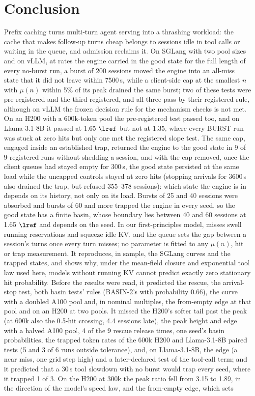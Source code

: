 \section{Conclusion}\label{sec:conclusion}

Prefix caching turns multi-turn agent serving into a thrashing workload: the cache that makes follow-up turns cheap belongs to sessions idle in tool calls or waiting in the queue, and admission reclaims it. On SGLang with two pool sizes and on vLLM, at rates the engine carried in the good state for the full length of every no-burst run, a burst of 200 sessions moved the engine into an all-miss state that it did not leave within 7500\,s, while a client-side cap at the smallest $n$ with $\mu(n)$ within 5\% of its peak drained the same burst; two of these tests were pre-registered and the third registered, and all three pass by their registered rule, although on vLLM the frozen decision rule for the mechanism checks is not met. On an H200 with a 600k-token pool the pre-registered test passed too, and on Llama-3.1-8B it passed at 1.65 $\lref$ but not at 1.35, where every BURST run was stuck at zero hits but only one met the registered slope test. The same cap, engaged inside an established trap, returned the engine to the good state in 9 of 9 registered runs without shedding a session, and with the cap removed, once the client queues had stayed empty for 300\,s, the good state persisted at the same load while the uncapped controls stayed at zero hits (stopping arrivals for 3600\,s also drained the trap, but refused 355--378 sessions): which state the engine is in depends on its history, not only on its load. Bursts of 25 and 40 sessions were absorbed and bursts of 60 and more trapped the engine in every seed, so the good state has a finite basin, whose boundary lies between 40 and 60 sessions at 1.65 $\lref$ and depends on the seed. In our first-principles model, misses swell running reservations and squeeze idle KV, and the queue sets the gap between a session's turns once every turn misses; no parameter is fitted to any $\mu(n)$, hit or trap measurement. It reproduces, in sample, the SGLang curves and the trapped states, and shows why, under the mean-field closure and exponential tool law used here, models without running KV cannot predict exactly zero stationary hit probability. Before the results were read, it predicted the rescue, the arrival-stop test, both basin tests' rules (BASIN-2's with probability 0.66), the curve with a doubled A100 pool and, in nominal multiples, the from-empty edge at that pool and on an H200 at two pools. It missed the H200's softer tail past the peak (at 600k also the 0.5-hit crossing, 4.4 sessions late), the peak height and edge with a halved A100 pool, 4 of the 9 rescue release times, one seed's basin probabilities, the trapped token rates of the 600k H200 and Llama-3.1-8B paired tests (5 and 3 of 6 runs outside tolerance), and, on Llama-3.1-8B, the edge (a near miss, one grid step high) and a later-declared test of the tool-call term; and it predicted that a 30\,s tool slowdown with no burst would trap every seed, where it trapped 1 of 3. On the H200 at 300k the peak ratio fell from 3.15 to 1.89, in the direction of the model's speed law, and the from-empty edge, which sets 